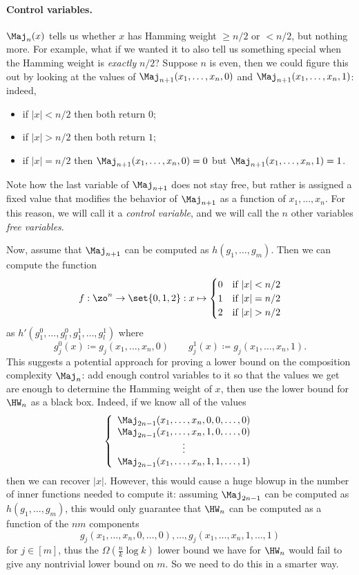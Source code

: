 \paragraph*{Control variables.}
$\Maj_n(x)$ tells us whether $x$ has Hamming weight $\geq n/2$ or $< n/2$, but nothing more.
For example, what if we wanted it to also tell us something special when the Hamming weight is \emph{exactly} $n/2$?
Suppose $n$ is even, then we could figure this out by looking at the values of $\Maj_{n+1}(x_1, \ldots, x_n, 0)$ and $\Maj_{n+1}(x_1, \ldots, x_n, 1)$: indeed,
\begin{itemize}
    \item if $|x|< n/2$ then both return $0$;
    \item if $|x|>n/2$ then both return $1$;
    \item if $|x|=n/2$ then $\Maj_{n+1}(x_1, \ldots, x_n, 0)=0$ but $\Maj_{n+1}(x_1, \ldots, x_n, 1)=1$.
\end{itemize}
Note how the last variable of $\Maj_{n+1}$ does not stay free, but rather is assigned a fixed value that modifies the behavior of $\Maj_{n+1}$ as a function of $x_1,\ldots, x_n$.
For this reason, we will call it a \emph{control variable}, and we will call the $n$ other variables \emph{free variables}.

Now, assume that $\Maj_{n+1}$ can be computed as $h(g_1, \ldots, g_m)$.
Then we can compute the function
\[
f: \zo^n \to \set{0,1,2}: x \mapsto
\begin{cases}
0 & \text{if $|x|<n/2$}\\
1 & \text{if $|x|=n/2$}\\
2 & \text{if $|x|>n/2$}
\end{cases}
\]
as $h'(g^0_1, \ldots, g^0_l, g^1_1, \ldots, g^1_l)$ where
\[
g^0_j(x) \coloneqq g_j(x_1, \ldots, x_n, 0) \qquad g^1_j(x) \coloneqq g_j(x_1, \ldots, x_n, 1).
\]
This suggests a potential approach for proving a lower bound on the composition complexity $\Maj_n$: add enough control variables to it so that the values we get are enough to determine the Hamming weight of $x$, then use the lower bound for $\HW_n$ as a black box.
Indeed, if we know all of the values
\[
\left\{
\begin{array}{c}
     \Maj_{2n-1}(x_1, \ldots, x_n, 0, 0, \ldots, 0) \\
     \Maj_{2n-1}(x_1, \ldots, x_n, 1, 0, \ldots, 0) \\
     \vdots\\
     \Maj_{2n-1}(x_1, \ldots, x_n, 1, 1, \ldots, 1)
\end{array}
\right.
\]
then we can recover $|x|$.
However, this would cause a huge blowup in the number of inner functions needed to compute it:
assuming $\Maj_{2n-1}$ can be computed as $h(g_1, \ldots, g_m)$, this would only guarantee that $\HW_n$ can be computed as a function of the $nm$ components 
\[g_j(x_1, \ldots, x_n, 0, \ldots, 0), \ldots, g_j(x_1, \ldots, x_n, 1, \ldots, 1)\]
for $j \in [m]$, thus the $\Omega(\frac{n}{k}\log k)$ lower bound we have for $\HW_n$ would fail to give any nontrivial lower bound on $m$.
So we need to do this in a smarter way.


